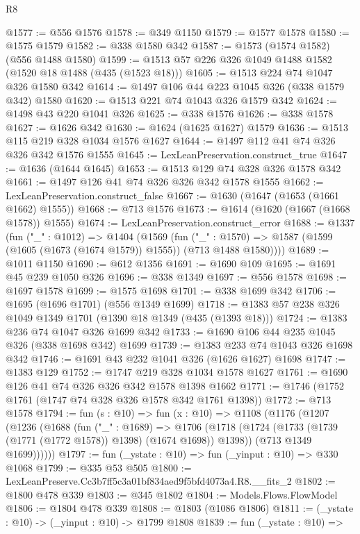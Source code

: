 \begin{lexlean}{R8}
\begin{coremodule}
@1577 := @556 @1576
@1578 := @349 @1150
@1579 := @1577 @1578
@1580 := @1575 @1579
@1582 := @338 @1580 @342
@1587 := @1573 (@1574 @1582) (@556 @1488 @1580)
@1599 := @1513 @57 @226 @326 @1049 @1488 @1582 (@1520 @18 @1488 (@435 (@1523 @18)))
@1605 := @1513 @224 @74 @1047 @326 @1580 @342
@1614 := @1497 @106 @44 @223 @1045 @326 (@338 @1579 @342) @1580
@1620 := @1513 @221 @74 @1043 @326 @1579 @342
@1624 := @1498 @43 @220 @1041 @326
@1625 := @338 @1576
@1626 := @338 @1578
@1627 := @1626 @342
@1630 := @1624 (@1625 @1627) @1579
@1636 := @1513 @115 @219 @328 @1034 @1576 @1627
@1644 := @1497 @112 @41 @74 @326 @326 @342 @1576 @1555
@1645 := LexLeanPreservation.construct_true
@1647 := @1636 (@1644 @1645)
@1653 := @1513 @129 @74 @328 @326 @1578 @342
@1661 := @1497 @126 @41 @74 @326 @326 @342 @1578 @1555
@1662 := LexLeanPreservation.construct_false
@1667 := @1630 (@1647 (@1653 (@1661 @1662) @1555))
@1668 := @713 @1576
@1673 := @1614 (@1620 (@1667 (@1668 @1578)) @1555)
@1674 := LexLeanPreservation.construct_error
@1688 := @1337
    (fun ("_" : @1012) =>
    @1404
      (@1569
        (fun ("_" : @1570) =>
        @1587 (@1599 (@1605 (@1673 (@1674 @1579)) @1555)) (@713 @1488 @1580))))
@1689 := @1011 @1150
@1690 := @612 @1356
@1691 := @1690 @109
@1695 := @1691 @45 @239 @1050 @326
@1696 := @338 @1349
@1697 := @556 @1578
@1698 := @1697 @1578
@1699 := @1575 @1698
@1701 := @338 @1699 @342
@1706 := @1695 (@1696 @1701) (@556 @1349 @1699)
@1718 := @1383 @57 @238 @326 @1049 @1349 @1701 (@1390 @18 @1349 (@435 (@1393 @18)))
@1724 := @1383 @236 @74 @1047 @326 @1699 @342
@1733 := @1690 @106 @44 @235 @1045 @326 (@338 @1698 @342) @1699
@1739 := @1383 @233 @74 @1043 @326 @1698 @342
@1746 := @1691 @43 @232 @1041 @326 (@1626 @1627) @1698
@1747 := @1383 @129
@1752 := @1747 @219 @328 @1034 @1578 @1627
@1761 := @1690 @126 @41 @74 @326 @326 @342 @1578 @1398 @1662
@1771 := @1746 (@1752 @1761 (@1747 @74 @328 @326 @1578 @342 @1761 @1398))
@1772 := @713 @1578
@1794 := fun (s : @10) =>
  fun (x : @10) =>
  @1108
    (@1176
      (@1207
        (@1236
          (@1688
            (fun ("_" : @1689) =>
            @1706
              (@1718 (@1724 (@1733 (@1739 (@1771 (@1772 @1578)) @1398) (@1674 @1698)) @1398))
              (@713 @1349 @1699))))))
@1797 := fun (_ystate : @10) => fun (_yinput : @10) => @330 @1068
@1799 := @335 @53 @505
@1800 := LexLeanPreserve.Cc3b7ff5c3a01bf834aed9f5bfd4073a4.R8.__fits_2
@1802 := @1800 @478 @339
@1803 := @345 @1802
@1804 := Models.Flows.FlowModel
@1806 := @1804 @478 @339
@1808 := @1803 (@1086 @1806)
@1811 := (_ystate : @10) -> (_yinput : @10) -> @1799 @1808
@1839 := fun (_ystate : @10) =>

\end{coremodule}
\end{lexlean}

